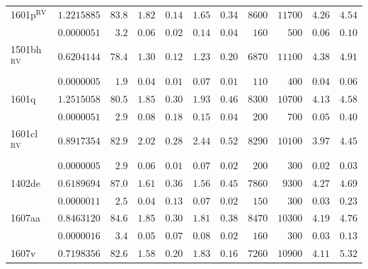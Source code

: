 \begin{table}
\begin{tabular}{@{}l *{10}{r} }
\noalign{\smallskip}
1601p$^\mathrm{RV}$ & $ 1.2215885$  & $      83.8$  & $      1.82$  & $      0.14$  & $      1.65$  & $      0.34$  & $8600$  & $11700$  & $      4.26$  & $      4.54$  \\
 & $ 0.0000051$  & $       3.2$  & $      0.06$  & $      0.02$  & $      0.14$  & $      0.04$  & $160$  & $500$  & $      0.06$  & $      0.10$  \\
\noalign{\smallskip}
1501bh$^\mathrm{RV}$ & $ 0.6204144$  & $      78.4$  & $      1.30$  & $      0.12$  & $      1.23$  & $      0.20$  & $6870$  & $11100$  & $      4.38$  & $      4.91$  \\
 & $ 0.0000005$  & $       1.9$  & $      0.04$  & $      0.01$  & $      0.07$  & $      0.01$  & $110$  & $400$  & $      0.04$  & $      0.06$  \\
\noalign{\smallskip}
1601q & $ 1.2515058$  & $      80.5$  & $      1.85$  & $      0.30$  & $      1.93$  & $      0.46$  & $8300$  & $10700$  & $      4.13$  & $      4.58$  \\
 & $ 0.0000051$  & $       2.9$  & $      0.08$  & $      0.18$  & $      0.15$  & $      0.04$  & $200$  & $700$  & $      0.05$  & $      0.40$  \\
\noalign{\smallskip}
1601cl$^\mathrm{RV}$ & $ 0.8917354$  & $      82.9$  & $      2.02$  & $      0.28$  & $      2.44$  & $      0.52$  & $8290$  & $10100$  & $      3.97$  & $      4.45$  \\
 & $ 0.0000005$  & $       2.9$  & $      0.06$  & $      0.01$  & $      0.07$  & $      0.02$  & $200$  & $300$  & $      0.02$  & $      0.03$  \\
\noalign{\smallskip}
1402de & $ 0.6189694$  & $      87.0$  & $      1.61$  & $      0.36$  & $      1.56$  & $      0.45$  & $7860$  & $9300$  & $      4.27$  & $      4.69$  \\
 & $ 0.0000011$  & $       2.5$  & $      0.04$  & $      0.13$  & $      0.07$  & $      0.02$  & $150$  & $300$  & $      0.03$  & $      0.23$  \\
\noalign{\smallskip}
1607aa & $ 0.8463120$  & $      84.6$  & $      1.85$  & $      0.30$  & $      1.81$  & $      0.38$  & $8470$  & $10300$  & $      4.19$  & $      4.76$  \\
 & $ 0.0000016$  & $       3.4$  & $      0.05$  & $      0.07$  & $      0.08$  & $      0.02$  & $160$  & $300$  & $      0.03$  & $      0.13$  \\
\noalign{\smallskip}
1607v & $ 0.7198356$  & $      82.6$  & $      1.58$  & $      0.20$  & $      1.83$  & $      0.16$  & $7260$  & $10900$  & $      4.11$  & $      5.32$  \\

\end{tabular}
\end{table}
